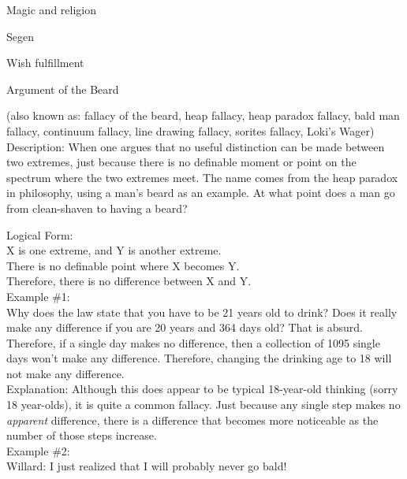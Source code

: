 \documentclass[a4paper,12pt,single,pdftex]{scrbook}
\begin{document}
Magic and religion

Segen

Wish fulfillment

Argument of the Beard
    
      (also known as: fallacy of the beard, heap fallacy, heap paradox fallacy, bald man fallacy, continuum fallacy, line drawing fallacy, sorites fallacy, Loki's Wager)
    \\

  
    Description: When one argues that no useful distinction can be made between two extremes, just because there is no definable moment or point on the spectrum where the two extremes meet.  The name comes from the heap paradox in philosophy, using a man’s beard as an example.  At what point does a man go from clean-shaven to having a beard?

    
      Logical Form:
    \\

    
      X is one extreme, and Y is another extreme.
    \\

    
      There is no definable point where X becomes Y.
    \\

    
      Therefore, there is no difference between X and Y.
    \\

    
      Example \#1:
    \\

    
      Why does the law state that you have to be 21 years old to drink?  Does it really make any difference if you are 20 years and 364 days old?  That is absurd.  Therefore, if a single day makes no difference, then a collection of 1095 single days won’t make any difference. Therefore, changing the drinking age to 18 will not make any difference.
    \\

    
      Explanation: Although this does appear to be typical 18-year-old thinking (sorry 18 year-olds), it is quite a common fallacy.  Just because any single step makes no {\it apparent} difference, there is a difference that becomes more noticeable as the number of those steps increase.
    \\

    
      Example \#2:
    \\

    
      Willard: I just realized that I will probably never go bald!
    \\
\end{document}
